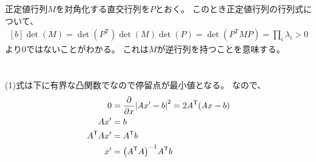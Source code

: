 \documentclass[../ap_2014.tex]{subfiles}
\begin{document}
正定値行列\(M\)を対角化する直交行列を\(P\)とおく。
このとき正定値行列の行列式について、
\begin{equation}\begin{aligned}[b]
    \det(M) = \det(P^\mathsf{T})\det(M)\det(P) = \det(P^\mathsf{T}MP) = \prod_i \lambda_i > 0
\end{aligned}\end{equation}
より\(0\)ではないことがわかる。
これは\(M\)が逆行列を持つことを意味する。

\section{}
(1)式は下に有界な凸関数でなので停留点が最小値となる。
なので、
\begin{equation}\begin{aligned}[b]
    0 &= \pdv{x}\abs{Ax'-b}^2 = 2A^\mathsf{T}(Ax-b)\\
    Ax' &= b\\
    A^\mathsf{T}Ax' &= A^\mathsf{T}b\\
    x' &= \qty(A^\mathsf{T}A)^{-1}A^\mathsf{T}b
\end{aligned}\end{equation}
\end{document}

